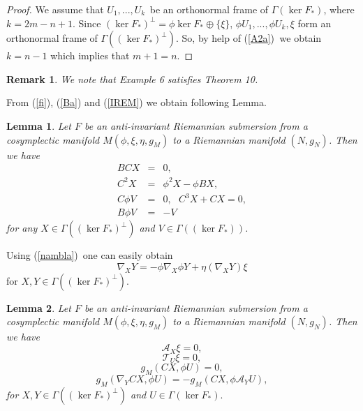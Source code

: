 \documentclass{amsart}
\theoremstyle{plain}
\newtheorem{lemma}{Lemma}
\newtheorem{remark}{Remark}
\numberwithin{equation}{section}
\begin{document}
\begin{proof}
We assume that $U_{1},...,U_{k\text{ }}$be an orthonormal frame of $\Gamma
(\ker F_{\ast })$, where $k=2m-n+1$. Since $(\ker F_{\ast })^{\bot }=\phi
\ker F_{\ast }\oplus \{\xi \}$, $\phi U_{1},...,\phi U_{k},\xi $ form an
orthonormal frame of $\Gamma ((\ker F_{\ast })^{\bot })$. So, by help of (\ref{A2a}) $\ $we obtain $k=n-1$ which implies that $m+1=n$.
\end{proof}

\begin{remark}
We note that Example 6 satisfies Theorem 10.
\end{remark}

From (\ref{fi}), (\ref{Ba}) and (\ref{IREM}) we obtain following Lemma.

\begin{lemma}
Let $F$ be an anti-invariant Riemannian submersion from a cosymplectic
manifold $M(\phi ,\xi ,\eta ,g_{M})$ to a Riemannian manifold $(N,g_{N})$.
Then we have\begin{eqnarray*}
BCX &=&0,\text{ \ } \\
C^{2}X &=&\phi ^{2}X-\phi BX, \\
C\phi V &=&0,\text{ \ }C^{3}X+CX=0, \\
B\phi V &=&-V
\end{eqnarray*}for any $X\in \Gamma ((\ker F_{\ast })^{\bot })$ and $V\in \Gamma ((\ker
F_{\ast }))$.
\end{lemma}

Using (\ref{nambla})\ one can easily obtain 
\begin{equation}
\nabla _{X}Y=-\phi \nabla _{X}\phi Y+\eta (\nabla _{X}Y)\xi
\label{Namblafi3}
\end{equation}for $X,Y\in \Gamma ((\ker F_{\ast })^{\bot }).$

\begin{lemma}
Let $F$ be an anti-invariant Riemannian submersion from a cosymplectic
manifold $M(\phi ,\xi ,\eta ,g_{M})$ to a Riemannian manifold $(N,g_{N})$.
Then we have\begin{equation}
\mathcal{A}_{X}\xi =0,  \label{IKE1}
\end{equation}\begin{equation}
\mathcal{T}_{U}\xi =0,  \label{IKE2}
\end{equation}\begin{equation}
g_{M}(CX,\phi U)=0,  \label{IKE3}
\end{equation}\begin{equation}
g_{M}(\nabla _{Y}CX,\phi U)=-g_{M}(CX,\phi \mathcal{A}_{Y}U),  \label{IKE4}
\end{equation}for $X,Y\in \Gamma ((\ker F_{\ast })^{\bot })$ and $U\in \Gamma (\ker
F_{\ast }).$
\end{lemma}
\end{document}
